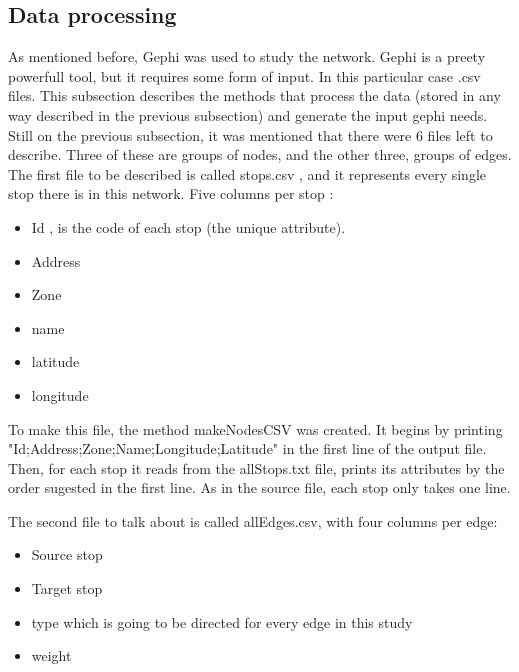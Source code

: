 \documentclass[12pt]{article}
\begin{document}
\subsection{Data processing}
	
	As mentioned before, Gephi was used to study the network. Gephi is a preety powerfull tool, but it requires some form of input. In this particular case .csv files. This subsection describes the methods that process the data (stored in any way described in the previous subsection) and generate the input gephi needs.\\
	Still on the previous subsection, it was mentioned that there were 6 files left to describe. Three of these are groups of nodes, and the other three, groups of edges. \\
	
	The first file to be described is called stops.csv , and it represents every single stop there is in this network. Five columns per stop :
	
	\begin{itemize}
		\item Id , is the code of each stop (the unique attribute).
		\item Address
		\item Zone
		\item name
		\item latitude
		\item longitude
	\end{itemize}
	
	To make this file, the method makeNodesCSV was created.
	It begins by printing "Id;Address;Zone;Name;Longitude;Latitude" in the first line of the output file. Then, for each stop it reads from the allStops.txt file, prints its attributes by the order sugested in the first line. As in the source file, each stop only takes one line.
	
	The second file to talk about is called allEdges.csv, with four columns per edge:
	
	\begin{itemize}
		\item Source stop
		\item Target stop
		\item type which is going to be directed for every edge in this study
		\item weight 
	\end{itemize}
	
\end{document}

